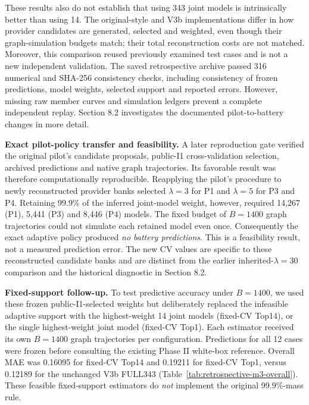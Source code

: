 \documentclass[10pt,a4paper]{article}
\begin{document}
These results also do not establish that using 343 joint models is intrinsically better than using 14. The original-style and V3b implementations differ in how provider candidates are generated, selected and weighted, even though their graph-simulation budgets match; their total reconstruction costs are not matched. Moreover, this comparison reused previously examined test cases and is not a new independent validation. The saved retrospective archive passed 316 numerical and SHA-256 consistency checks, including consistency of frozen predictions, model weights, selected support and reported errors. However, missing raw member curves and simulation ledgers prevent a complete independent replay. Section 8.2 investigates the documented pilot-to-battery changes in more detail.


\textbf{Exact pilot-policy transfer and feasibility.} A later reproduction gate verified the original pilot's candidate proposals, public-I1 cross-validation selection, archived predictions and native graph trajectories. Its favorable result was therefore computationally reproducible. Reapplying the pilot's procedure to newly reconstructed provider banks selected $\lambda=3$ for P1 and $\lambda=5$ for P3 and P4. Retaining 99.9\% of the inferred joint-model weight, however, required 14,267 (P1), 5,441 (P3) and 8,446 (P4) models. The fixed budget of $B=1400$ graph trajectories could not simulate each retained model even once. Consequently the exact adaptive policy produced \emph{no battery predictions}. This is a feasibility result, not a measured prediction error. The new CV values are specific to these reconstructed candidate banks and are distinct from the earlier inherited-$\lambda=30$ comparison and the historical diagnostic in Section 8.2.

\textbf{Fixed-support follow-up.} To test predictive accuracy under $B=1400$, we used these frozen public-I1-selected weights but deliberately replaced the infeasible adaptive support with the highest-weight 14 joint models (fixed-CV Top14), or the single highest-weight joint model (fixed-CV Top1). Each estimator received its own $B=1400$ graph trajectories per configuration. Predictions for all 12 cases were frozen before consulting the existing Phase II white-box reference. Overall MAE was 0.16095 for fixed-CV Top14 and 0.19211 for fixed-CV Top1, versus 0.12189 for the unchanged V3b FULL343 (Table~\ref{tab:retrospective-m3-overall}). These feasible fixed-support estimators do \emph{not} implement the original 99.9\%-mass rule.
\end{document}
